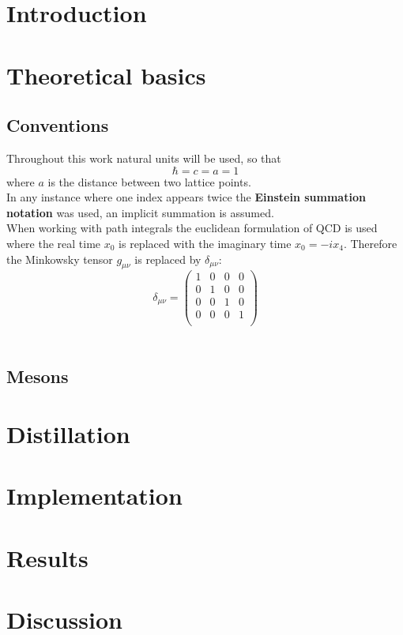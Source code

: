 \documentclass{style}
\begin{document}
    \section{Introduction}
    
	\section{Theoretical basics}
	\subsection{Conventions}
	Throughout this work natural units will be used, so that
	$$\hbar = c = a = 1$$
	where $a$ is the distance between two lattice points.\\
	
	In any instance where one index appears twice the \textbf{Einstein summation notation} was used, an implicit summation is assumed.\\
	
	When working with path integrals the euclidean formulation of QCD is used where the real time $x_0$ is replaced with the imaginary time $x_0 = -ix_4$. Therefore the Minkowsky tensor $g_{\mu\nu}$ is replaced by $\delta_{\mu\nu}$:
	$$\delta_{\mu\nu} = 
	\begin{pmatrix}
	1 & 0 & 0 & 0 \\
	0 & 1 & 0 & 0 \\
	0 & 0 & 1 & 0 \\
	0 & 0 & 0 & 1 \\
	\end{pmatrix}
	$$\\
	
	
	
	
	
	\subsection{Mesons}
	
	\newpage
	
	\section{Distillation}
	
	
	
	
	\section{Implementation}
	
	
	
	\section{Results}
	
	
	
	\section{Discussion}
	
	
	
	\newpage
	
	
\end{document}
